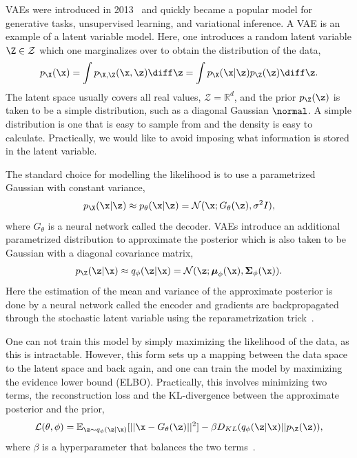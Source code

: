 VAEs were introduced in 2013~\cite{AutoEncodingVariationalBayes} and quickly became a popular model for generative tasks, unsupervised learning, and variational inference.
A VAE is an example of a latent variable model.
Here, one introduces a random latent variable $\Z \in \mathcal{Z}$ which one marginalizes over to obtain the distribution of the data,
\begin{equation}
 p_\X(\x) = \int p_{\X,\Z}(\x, \z)\diff\z = \int p_\X(\x|\z)p_\Z(\z)\diff\z.
\end{equation}
The latent space usually covers all real values, $\mathcal{Z} = \mathbb{R}^d$, and the prior $p_\Z(\z)$ is taken to be a simple distribution, such as a diagonal Gaussian $\normal$.
A simple distribution is one that is easy to sample from and the density is easy to calculate.
Practically, we would like to avoid imposing what information is stored in the latent variable.

The standard choice for modelling the likelihood is to use a parametrized Gaussian with constant variance,
\begin{equation}
 p_\X(\x|\z) \approx p_{\theta}(\x|\z) = \mathcal{N}(\x; G_{\theta}(\z), \sigma^2 I),
\end{equation}
where $G_{\theta}$ is a neural network called the decoder.
VAEs introduce an additional parametrized distribution to approximate the posterior which is also taken to be Gaussian with a diagonal covariance matrix,
\begin{equation}
    p_\Z(\z|\x) \approx q_\phi(\z|\x) = \mathcal{N}(\z; \boldsymbol{\mu}_\phi(\x), \boldsymbol{\Sigma}_\phi(\x)).
\end{equation}
Here the estimation of the mean and variance of the approximate posterior is done by a neural network called the encoder and gradients are backpropagated through the stochastic latent variable using the reparametrization trick~\cite{AutoEncodingVariationalBayes}.

One can not train this model by simply maximizing the likelihood of the data, as this is intractable.
However, this form sets up a mapping between the data space to the latent space and back again, and one can train the model by maximizing the evidence lower bound (ELBO).
Practically, this involves minimizing two terms, the reconstruction loss and the KL-divergence between the approximate posterior and the prior,
\begin{equation}
    \mathcal{L}(\theta, \phi) = \mathbb{E}_{\z \sim q_{\phi}(\z|\x)}[||\x - G_{\theta}(\z)||^2] - \beta D_{KL}(q_{\phi}(\z|\x) || p_\Z(\z)),
\end{equation}
where $\beta$ is a hyperparameter that balances the two terms~\cite{BetaVAE}.

